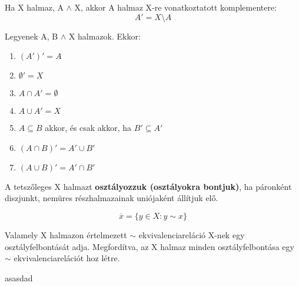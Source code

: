 \documentclass{beamer}
\begin{document}
\begin{frame}

\begin{tcolorbox}[title={Definíció: Komplementer}]
Ha X halmaz, A $\wedge$ X, akkor A halmaz X-re vonatkoztatott komplementere:\\
$$A' = X \setminus A$$
\end{tcolorbox}

\begin{tcolorbox}[title={Tétel: A komplementer tulajdonságai}]
Legyenek A, B $\wedge$ X halmazok. Ekkor:

\begin{enumerate}
\item $(A')' = A$
\item $\emptyset' = X$
\item $A \cap A' = \emptyset$
\item $A \cup A' = X$
\item $A \subseteq B$ akkor, és csak akkor, ha $B' \subseteq A'$
\item $(A \cap B)' = A' \cup B'$
\item $(A \cup B)' = A' \cap B'$
\end{enumerate}
\end{tcolorbox}

\end{frame}

\begin{frame}

\begin{tcolorbox}[title={Definíció: Halmaz osztályfelbontása}]
A tetszőleges X halmazt \textbf{osztályozzuk (osztályokra bontjuk)}, ha páronként diszjunkt, nemüres részhalmazainak uniójaként állítjuk elő.
\end{tcolorbox}

\begin{tcolorbox}[title={Az X $\in$ X elem \textbf{ekvivalencia osztálya}:}]
$$\overline{x} = \{y \in X : y \sim x\}$$
\end{tcolorbox}

\begin{tcolorbox}[title={Tétel: Ekvivalenciareláció és osztályfelbontás kapcsolata}]
Valamely X halmazon értelmezett $\sim$ ekvivalenciareláció X-nek egy osztályfelbontását adja. Megfordítva, az X halmaz minden osztályfelbontása egy $\sim$ ekvivalenciarelációt hoz létre.
\end{tcolorbox}

\begin{tcolorbox}[title={Biz}]
asasdad
\end{tcolorbox}

\end{frame}
\end{document}
